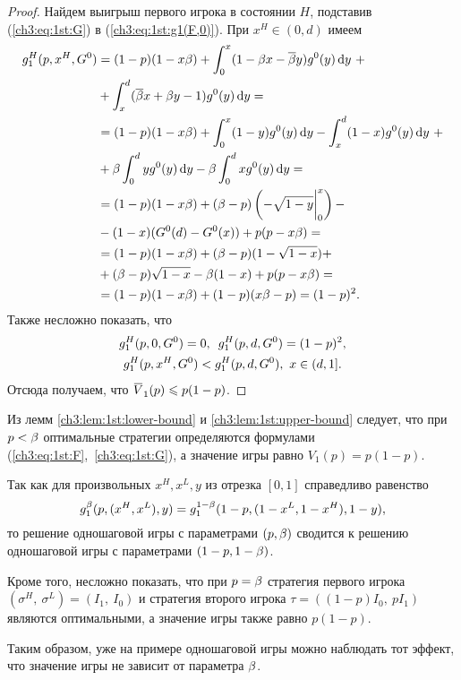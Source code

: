 {\begin{proof}
  Найдем выигрыш первого игрока в состоянии $H$, подставив (\ref{ch3:eq:1st:G}) в (\ref{ch3:eq:1st:g1(F,0)}).
  При $x^H \in (0, d)$ имеем
  \begin{align*}
    g^H_1(p, x^H, G^0)
    &= (1 - p)(1 - x\beta)
      + \int_0^x (1 - \beta x - {{\overline{\beta}}} y) g^0(y) \mathop{}\!\mathrm{d} y\ + \\
    &+ \int_x^d ({{\overline{\beta}}} x + \beta y - 1) g^0(y) \mathop{}\!\mathrm{d} y = \\
    &= (1 - p)(1 - x\beta)
      + \int_0^x (1-y) g^0(y) \mathop{}\!\mathrm{d} y - \int_x^d (1-x) g^0(y) \mathop{}\!\mathrm{d} y\ + \\
    &+ \beta \int_0^d y g^0(y) \mathop{}\!\mathrm{d} y - \beta \int_0^d x g^0(y) \mathop{}\!\mathrm{d} y = \\
    &= (1 - p)(1 - x\beta)
      + (\beta - p)\left(-\sqrt{1-y}\bigg|_0^x\right) - \\
    &- (1 - x)(G^0(d) - G^0(x))
      + p(p - x\beta) = \\
    &= (1 - p)(1 - x\beta)
      + (\beta - p)(1 - \sqrt{1-x}) + \\
    &+ (\beta - p)\sqrt{1-x} - \beta (1 - x) + p(p - x\beta) = \\
    &= (1 - p)(1 - x\beta) + (1 - p)(x\beta - p) = (1 - p)^2.
  \end{align*}
  Также несложно показать, что 
  \begin{gather*}
    g^H_1(p, 0, G^0) = 0,\enskip
    g^H_1(p, d, G^0) = (1 - p)^2, \\
    g^H_1(p, x^H, G^0) < g^H_1(p, d, G^0),\ x \in (d, 1].
  \end{gather*}
  Отсюда получаем, что $\HV{1}(p) \leq p(1-p)$.
\end{proof}

Из лемм \ref{ch3:lem:1st:lower-bound} и \ref{ch3:lem:1st:upper-bound} следует, что при $p < \beta$ оптимальные стратегии определяются формулами (\ref{ch3:eq:1st:F},~\ref{ch3:eq:1st:G}), а значение игры равно $V_1(p) = p(1-p)$.

Так как для произвольных $x^H, x^L, y$ из отрезка $[0, 1]$ справедливо равенство
\[
  g^{\beta}_1(p, (x^H, x^L), y) = g^{1-\beta}_1(1 - p, (1 - x^L, 1 - x^H), 1 - y),
\]
то решение одношаговой игры с параметрами $(p, \beta)$ сводится к решению одношаговой игры с параметрами $(1 - p, 1 - \beta)$.

Кроме того, несложно показать, что при $p = \beta$ стратегия первого игрока $(\sigma^H,\ \sigma^L) = (I_1,\ I_0)$ и стратегия второго игрока $\tau = \left( (1-p) I_0,\ p I_1 \right)$ являются оптимальными, а значение игры также равно $p(1-p)$.

Таким образом, уже на примере одношаговой игры можно наблюдать тот эффект, что значение игры не зависит от параметра $\beta$.

}

